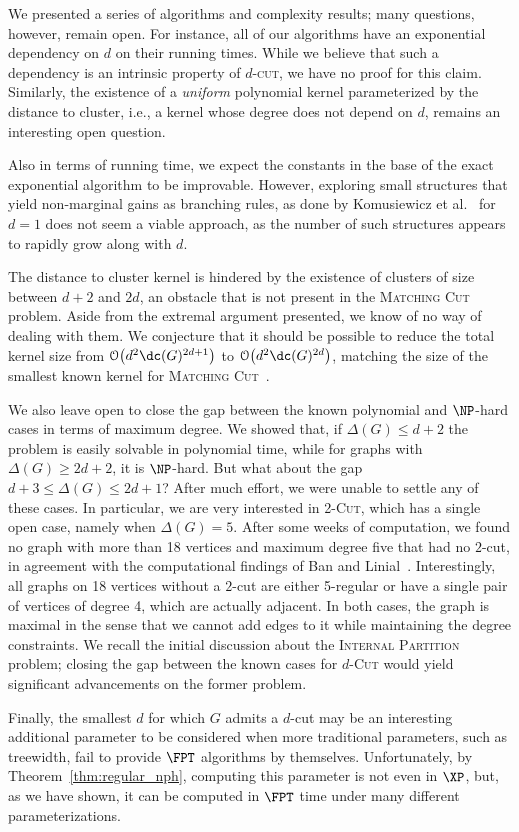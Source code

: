 \documentclass[a4paper,UKenglish,cleveref, autoref]{lipics-v2019}
\newcommand{\ig}[1]{\textcolor{red}{[Ig: #1]}}
\newcommand{\bigO}[1]{\mathcal{O}\!\left(#1\right)}
\newcommand{\pname}[1]{\textsc{#1}}
\begin{document}
We presented a series of algorithms and complexity results; many questions, however, remain open.
For instance, all of our algorithms have an exponential dependency on $d$ on their running times.
While we believe that such a dependency is an intrinsic property of \pname{$d$-cut}, we have no proof for this claim. Similarly, the existence of a {\sl uniform} polynomial kernel parameterized by the distance to cluster, i.e., a kernel whose degree does not depend on $d$, remains an interesting open question.

Also in terms of running time, we expect the constants in the base of the exact exponential algorithm to be improvable. However, exploring small structures that yield non-marginal gains as branching rules, as done by Komusiewicz et al.~\cite{matching_cut_ipec} for $d=1$ does not seem a viable approach, as the number of such structures appears to rapidly grow along with $d$.



The distance to cluster kernel is hindered by the existence of clusters of size between $d+2$ and $2d$, an obstacle that is not present in the \pname{Matching Cut} problem.
Aside from the extremal argument presented, we know of no way of dealing with them.
We conjecture that it should be possible to reduce the total kernel size from $\bigO{d^2\dc(G)^{2d+1}}$ to $\bigO{d^2\dc(G)^{2d}}$, matching the size of the smallest known kernel for \pname{Matching Cut}~\cite{matching_cut_ipec}.

We also leave open to close the gap between the known polynomial and $\NP$-hard cases in terms of maximum degree.
We showed that, if $\Delta(G) \leq d+2$ the problem is easily solvable in polynomial time, while for graphs with $\Delta(G) \geq 2d+2$, it is $\NP$-hard.
But what about the gap $d+3 \leq \Delta(G) \leq 2d+1$?
After much effort, we were unable to settle any of these cases.
In particular, we are very interested in \pname{2-Cut},  which has a single open case, namely when $\Delta(G) = 5$.
After some weeks of computation, we found no graph with more than 18 vertices and maximum degree five that had no $2$-cut, in agreement with the computational findings of Ban and Linial~\cite{internal_partition_regular6}.
Interestingly, all graphs on 18 vertices without a $2$-cut are either 5-regular or have a single pair of vertices of degree 4, which are actually adjacent.
In both cases, the graph is maximal in the sense that we cannot add edges to it while maintaining the degree constraints.
We recall the initial discussion about the \pname{Internal Partition} problem; closing the gap between the known cases for \textsc{$d$-Cut} would yield significant advancements on the former problem.

Finally, the smallest $d$ for which $G$ admits a $d$-cut may be an interesting additional parameter to be considered when more traditional parameters, such as treewidth, fail to provide $\FPT$ algorithms by themselves.
Unfortunately, by Theorem~\ref{thm:regular_nph}, computing this parameter is not even in $\XP$, but, as we have shown, it can be computed in $\FPT$ time under many different parameterizations.

%


\end{document}

